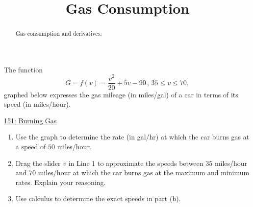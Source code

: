\documentclass{ximera}
\title{Gas Consumption}
\begin{document}
\begin{abstract}
Gas consumption and derivatives.
\end{abstract}
\maketitle


\begin{question} \label{Q5hhhhgeyghhg}
The function
\[
    G = f(v) = \frac{v^2}{20} + 5v -90 \, , \, 35\leq v \leq 70 ,
\]
graphed below expresses the gas mileage (in miles/gal) of a car in terms of its speed (in miles/hour).

\begin{onlineOnly}
    \begin{center}
\end{center}
\end{onlineOnly}

\href{https://www.desmos.com/calculator/ttmyizszfb}{151: Burning Gas}

\begin{enumerate}
\item Use the graph to determine the rate (in gal/hr) at which the car burns gas at a speed of $50$ miles/hour.

\item Drag the slider $v$ in Line 1 to approximate the speeds between $35$ miles/hour and $70$ miles/hour at which the car burns gas at the maximum and minimum rates. Explain your reasoning.

\item Use calculus to determine the exact speeds in part (b).

\end{enumerate}


\end{question}
\end{document}
